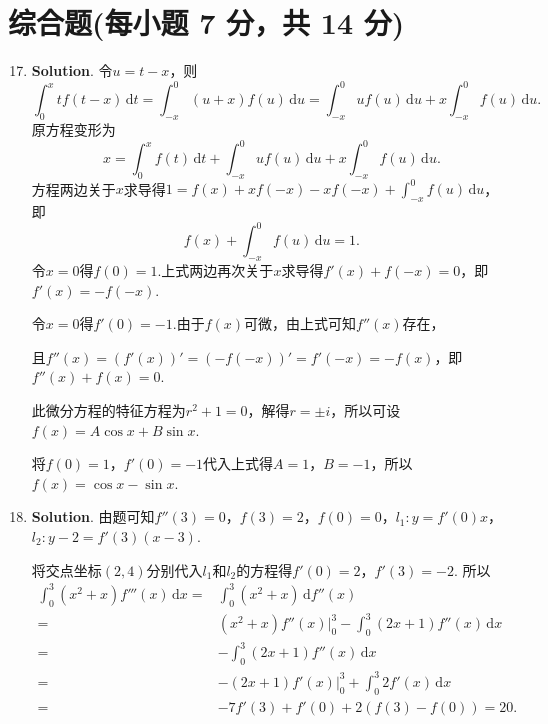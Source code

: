 \documentclass[../main.tex]{subfiles}
\begin{document}
\section{综合题(每小题 7 分，共 14 分)}
\begin{enumerate}
    \setcounter{enumi}{16}
    \item \textbf{Solution}. 令$u=t-x$，则
          \[
              \int_{0}^{x}tf(t-x)\,\mathrm{d}t = \int_{-x}^{0}(u+x)f(u)\,\mathrm{d}u=\int_{-x}
              ^{0}uf(u)\,\mathrm{d}u+x\int_{-x}^{0}f(u)\,\mathrm{d}u.
          \]
          原方程变形为
          \[
              x=\int_{0}^{x}f(t)\,\mathrm{d}t+\int_{-x}^{0}uf(u)\,\mathrm{d}u+x\int_{-x}^{0}
              f(u)\,\mathrm{d}u.
          \]
          方程两边关于$x$求导得$1=f(x)+xf(-x)-xf(-x)+\int_{-x}^{0}f(u)\,\mathrm{d}u$，即
          \[
              f(x)+\int_{-x}^{0}f(u)\,\mathrm{d}u=1.
          \]
          令$x=0$得$f(0)=1$.上式两边再次关于$x$求导得$f'(x)+f(-x)=0$，即$f'(x)=-f(-x)$.

          令$x=0$得$f'(0)=-1$.由于$f(x)$可微，由上式可知$f''(x)$存在，

          且$f''(x)=(f'(x))'=(-f(-x))'=f'(-x)=-f(x)$，即$f''(x)+f(x)=0$.

          此微分方程的特征方程为$r^{2}+1=0$，解得$r=\pm i$，所以可设$f(x)=A\cos x+B\sin x$.

          将$f(0)=1$，$f'(0)=-1$代入上式得$A=1$，$B=-1$，所以$f(x)=\cos x-\sin x$.

    \item \textbf{Solution}. 由题可知$f''(3)=0$，$f(3)=2$，$f(0)=0$，$l_{1}:
              y=f'(0)x$，$l_{2}:y-2=f'(3)(x-3)$.

          将交点坐标$(2,4)$分别代入$l_{1}$和$l_{2}$的方程得$f'(0)=2$，$f'(3)=-2$.
          所以
          \[
              \begin{aligned}
                  \int_{0}^{3}(x^{2}+x)f'''(x)\,\mathrm{d}x = {} & \int_{0}^{3}(x^{2}+x)\,\mathrm{d}f''(x)                             \\
                  = {}                                           & (x^{2}+x)f''(x)\bigg|_{0}^{3}-\int_{0}^{3}(2x+1)f''(x)\,\mathrm{d}x \\
                  = {}                                           & -\int_{0}^{3}(2x+1)f''(x)\,\mathrm{d}x                              \\
                  = {}                                           & -(2x+1)f'(x)\bigg|_{0}^{3}+\int_{0}^{3}2f'(x)\,\mathrm{d}x          \\
                  = {}                                           & -7f'(3)+f'(0)+2(f(3)-f(0)) = 20.
              \end{aligned}
          \]
\end{enumerate}
\end{document}
